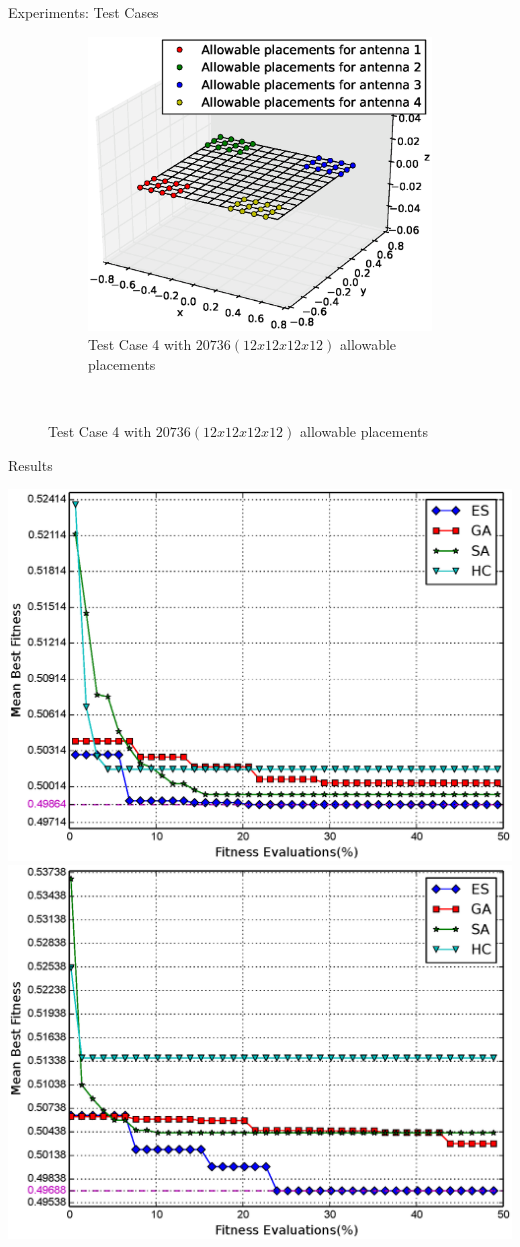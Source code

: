 \documentclass{beamer}
\begin{document}
\begin{frame}{Experiments: Test Cases}
\begin{figure}
\begin{subfigure}{.5\columnwidth}
                    \includegraphics[width=\columnwidth, height=\columnwidth]{../paper/FIG/tc_4_figure}%
                    \caption{\tiny Test Case 4 with $20736 (12x12x12x12)$ allowable placements}%
                    \label{fig:tc4_figure}%
                \end{subfigure}\hfill\\%
            \end{figure}
        \end{frame}

        \begin{frame}{Results}
            \begin{center}
                \includegraphics[width=.49\textwidth]{../paper/FIG/tc1_mf.eps}
                \includegraphics[width=.49\textwidth]{../paper/FIG/tc2_mf.eps}
            \end{center}
        \end{frame}
\end{document}
